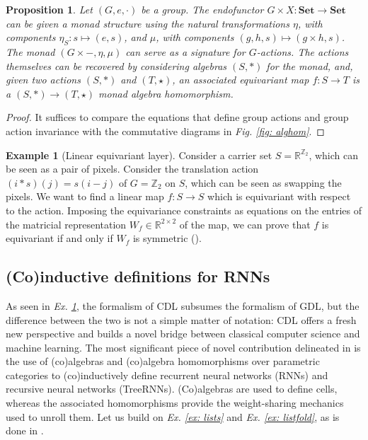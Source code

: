 \documentclass[11pt,a4paper,openright,twoside]{report}
\newcounter{mycounter}
\theoremstyle{plain}
\newtheorem{proposition}[mycounter]{Proposition}
\theoremstyle{definition}
\newtheorem{example}[mycounter]{Example}
\begin{document}
\begin{proposition}
  Let $(G,e,\cdot)$ be a group. The endofunctor $G \times X: \mathbf{Set} \to \mathbf{Set}$ can be given a monad structure using the natural transformations $\eta$, with components $\eta_S: s \mapsto (e,s)$, and $\mu$, with components $(g,h,s) \mapsto (g \times h, s)$. 
  The monad $(G \times -, \eta, \mu)$ can serve as a signature for $G$-actions. The actions themselves can be recovered by considering algebras $(S,\ast)$ for the monad, and, given two actions $(S,\ast)$ and $(T,\star)$, an associated equivariant map $f: S \to T$ is a $(S,\ast) \to (T,\star)$ monad algebra homomorphism.
\end{proposition}
\begin{proof}
  It suffices to compare the equations that define group actions and group action invariance with the commutative diagrams in \textit{Fig. \ref{fig: alghom}}.
\end{proof}

\begin{example}[Linear equivariant layer]
  \label{ex: translationaction}
  Consider a carrier set $S = \mathbb{R}^{\mathbb{Z}_2}$, which can be seen as a pair of pixels. Consider the translation action $(i \ast s)(j) = s(i-j)$ of $G = \mathbb{Z}_2$ on $S$, which can be seen as swapping the pixels.
  We want to find a linear map $f: S \to S$ which is equivariant with respect to the action. Imposing the equivariance constraints as equations on the entries of the matricial representation $W_f \in \mathbb{R}^{2 \times 2}$ of the map, we can prove that $f$ is equivariant if and only if $W_f$ is symmetric (\cite{gavranovicposition}).
\end{example}

\subsection{(Co)inductive definitions for RNNs}

As seen in \textit{Ex. \ref{ex: translationaction}}, the formalism of CDL subsumes the formalism of GDL, but the difference between the two is not a simple matter of notation: CDL offers a fresh new perspective and builds a novel bridge between classical computer science and machine learning. The most significant piece of novel contribution delineated in \cite{gavranovicposition} is the use of (co)algebras and (co)algebra homomorphisms over parametric categories to (co)inductively define recurrent neural networks (RNNs) and recursive neural networks (TreeRNNs). (Co)algebras are used to define cells, whereas the associated homomorphisms provide the weight-sharing mechanics used to unroll them. Let us build on \textit{Ex. \ref{ex: lists}} and \textit{Ex. \ref{ex: listfold}}, as is done in \cite{gavranovicposition}.
\end{document}
